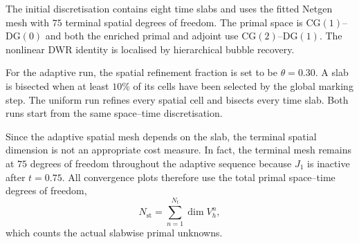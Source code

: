 The initial discretisation contains eight time slabs and uses the fitted Netgen mesh with $75$ terminal spatial degrees of freedom. The primal space is $\mathrm{CG}(1)$--$\mathrm{DG}(0)$ and both the enriched primal and adjoint use $\mathrm{CG}(2)$--$\mathrm{DG}(1)$. The nonlinear DWR identity is localised by hierarchical bubble recovery.

For the adaptive run, the spatial refinement fraction is set to be $\theta=0.30$. A slab is bisected when at least $10\%$ of its cells have been selected by the global marking step. The uniform run refines every spatial cell and bisects every time slab. Both runs start from the same space--time discretisation.

Since the adaptive spatial mesh depends on the slab, the terminal spatial dimension is not an appropriate cost measure. In fact, the terminal mesh remains at $75$ degrees of freedom throughout the adaptive sequence because $J_1$ is inactive after $t=0.75$. All convergence plots therefore use the total primal space--time degrees of freedom,
\begin{equation}
  N_{\mathrm{st}}=\sum_{n=1}^{N_t}\dim V_h^n,
  \label{eq:lshape-spacetime-dofs}
\end{equation}
which counts the actual slabwise primal unknowns.

